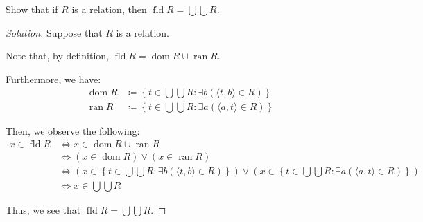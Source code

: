\documentclass{article}
\newenvironment{solution}{\begin{proof}[Solution]}{\end{proof}}
\DeclareMathOperator*{\dom}{\mathrm{dom}}
\DeclareMathOperator*{\ran}{\mathrm{ran}}
\DeclareMathOperator*{\fld}{\mathrm{fld}}
\newcommand{\pr}[1]{\left( {#1} \right)}
\newcommand{\brc}[1]{ \left\{  {#1} \right\}}
\newcommand{\ang}[1]{\langle {#1} \rangle}
\begin{document}
	\setcounter{subsection}{7}
	\begin{hw}
		Show that if $R$ is a relation, then $\fld R = \bigcup \bigcup R$.
	\end{hw}
	\begin{solution}
		Suppose that $R$ is a relation.
		
		Note that, by definition, $\fld R = \dom R \cup \ran R$.
		
		Furthermore, we have:
		\begin{align*}
			\dom R &\coloneq \brc{t \in \bigcup\bigcup R : \exists b \pr{\ang{t,b} \in R}} \\
			\ran R &\coloneq \brc{t \in \bigcup\bigcup R : \exists a \pr{\ang{a,t} \in R}}
		\end{align*}
		
		Then, we observe the following:
		\begin{align*}
			x \in \fld R &\iff x \in \dom R \cup \ran R \\
			&\iff \pr{x \in \dom R} \lor \pr{x \in \ran R} \\
			&\iff \pr{x \in  \brc{t \in \bigcup\bigcup R : \exists b \pr{\ang{t,b} \in R}}} \lor \pr{x \in  \brc{t \in \bigcup\bigcup R : \exists a \pr{\ang{a,t} \in R}}} \\
			&\iff x \in \bigcup\bigcup R
		\end{align*}
		
		Thus, we see that $\fld R = \bigcup\bigcup R$.
		
		\begin{comment}
			Next, we will show that $\bigcup\bigcup R \subseteq \fld R$. Let us take some $x \in \bigcup \bigcup R$. Then, there exists a $y \in \bigcup R$ such that $x \in y \in \bigcup R$. Furthermore, there exists a $z \in R$ such that $x \in y \in z \in R$. Note then that since $R$ is a relation, all of its elements are an ordered pair, and thus $z$ is an ordered pair.
			
			Then, let us define $z = \ang{a,b} = \brc{ \brc{a}, \brc{a,b}}$. Note that, by definition, we have that $a \in \dom R$ and $b \in \ran R$.
			
			Now, we note that $y \in z$, so we have two cases:
			\begin{enumerate}
				\item $y = \brc{a}$, or
				\item $y = \brc{a,b}$.
			\end{enumerate}
			
			In the first case, we have that $y = \brc{a}$, and since $x \in y$, we see that $x = a \in \dom R$. Thus, $x \in \dom R \implies x \in \dom R \cup \ran R$ as desired.
			

\end{comment}
\end{solution}
\end{document}
